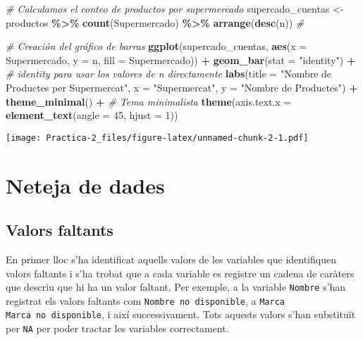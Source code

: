\documentclass[
]{article}
\newenvironment{Shaded}{\begin{snugshade}}{\end{snugshade}}
\newcommand{\AttributeTok}[1]{\textcolor[rgb]{0.13,0.29,0.53}{#1}}
\newcommand{\CommentTok}[1]{\textcolor[rgb]{0.56,0.35,0.01}{\textit{#1}}}
\newcommand{\DecValTok}[1]{\textcolor[rgb]{0.00,0.00,0.81}{#1}}
\newcommand{\FunctionTok}[1]{\textcolor[rgb]{0.13,0.29,0.53}{\textbf{#1}}}
\newcommand{\NormalTok}[1]{#1}
\newcommand{\OtherTok}[1]{\textcolor[rgb]{0.56,0.35,0.01}{#1}}
\newcommand{\SpecialCharTok}[1]{\textcolor[rgb]{0.81,0.36,0.00}{\textbf{#1}}}
\newcommand{\StringTok}[1]{\textcolor[rgb]{0.31,0.60,0.02}{#1}}
\begin{document}
\begin{Shaded}
\begin{Highlighting}[]
\CommentTok{\# Calculamos el conteo de productos por supermercado}
\NormalTok{supercado\_cuentas }\OtherTok{\textless{}{-}}\NormalTok{ productos }\SpecialCharTok{\%\textgreater{}\%} 
  \FunctionTok{count}\NormalTok{(Supermercado) }\SpecialCharTok{\%\textgreater{}\%}
  \FunctionTok{arrange}\NormalTok{(}\FunctionTok{desc}\NormalTok{(n))  }\CommentTok{\#}

\CommentTok{\# Creación del gráfico de barras}
\FunctionTok{ggplot}\NormalTok{(supercado\_cuentas, }\FunctionTok{aes}\NormalTok{(}\AttributeTok{x =}\NormalTok{ Supermercado, }\AttributeTok{y =}\NormalTok{ n, }\AttributeTok{fill =}\NormalTok{ Supermercado)) }\SpecialCharTok{+}
  \FunctionTok{geom\_bar}\NormalTok{(}\AttributeTok{stat =} \StringTok{"identity"}\NormalTok{) }\SpecialCharTok{+}  \CommentTok{\# \textquotesingle{}identity\textquotesingle{} para usar los valores de \textquotesingle{}n\textquotesingle{} directamente}
  \FunctionTok{labs}\NormalTok{(}\AttributeTok{title =} \StringTok{"Nombre de Productes per Supermercat"}\NormalTok{,}
       \AttributeTok{x =} \StringTok{"Supermercat"}\NormalTok{,}
       \AttributeTok{y =} \StringTok{"Nombre de Productes"}\NormalTok{) }\SpecialCharTok{+}
  \FunctionTok{theme\_minimal}\NormalTok{() }\SpecialCharTok{+}  \CommentTok{\# Tema minimalista}
  \FunctionTok{theme}\NormalTok{(}\AttributeTok{axis.text.x =} \FunctionTok{element\_text}\NormalTok{(}\AttributeTok{angle =} \DecValTok{45}\NormalTok{, }\AttributeTok{hjust =} \DecValTok{1}\NormalTok{))}
\end{Highlighting}
\end{Shaded}

\texttt{[image: Practica-2\_files/figure-latex/unnamed-chunk-2-1.pdf]}

\hypertarget{neteja-de-dades}{%
\section{Neteja de dades}\label{neteja-de-dades}}

\hypertarget{valors-faltants}{%
\subsection{Valors faltants}\label{valors-faltants}}

En primer lloc s'ha identificat aquells valors de les variables que
identifiquen valors faltants i s'ha trobat que a cada variable es
registre un cadena de caràters que descriu que hi ha un valor faltant.
Per exemple, a la variable \texttt{Nombre} s'han registrat els valors
faltants com \texttt{Nombre\ no\ disponible}, a \texttt{Marca}
\texttt{Marca\ no\ disponible}, i així successivament. Tots aquests
valors s'han substituït per \texttt{NA} per poder tractar les variables
correctament.
\end{document}
